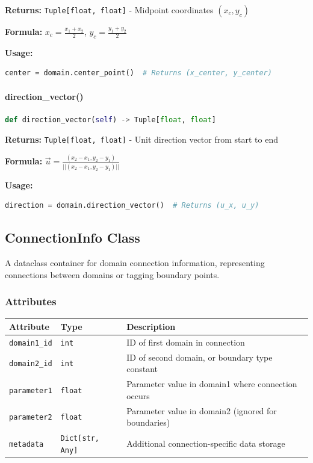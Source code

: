 \textbf{Returns:} \texttt{Tuple[float, float]} - Midpoint coordinates $(x_c, y_c)$

\textbf{Formula:} $x_c = \frac{x_1 + x_2}{2}$, $y_c = \frac{y_1 + y_2}{2}$

\textbf{Usage:}
\begin{lstlisting}[language=Python]
center = domain.center_point()  # Returns (x_center, y_center)
\end{lstlisting}

\paragraph{direction\_vector()}\leavevmode
\begin{lstlisting}[language=Python, caption=Direction Vector Calculation]
def direction_vector(self) -> Tuple[float, float]
\end{lstlisting}

\textbf{Returns:} \texttt{Tuple[float, float]} - Unit direction vector from start to end

\textbf{Formula:} $\vec{u} = \frac{(x_2-x_1, y_2-y_1)}{||(x_2-x_1, y_2-y_1)||}$

\textbf{Usage:}
\begin{lstlisting}[language=Python]
direction = domain.direction_vector()  # Returns (u_x, u_y)
\end{lstlisting}


\subsection{ConnectionInfo Class}
\label{subsec:connectioninfo_class}

A dataclass container for domain connection information, representing connections between domains or tagging boundary points.

\subsubsection{Attributes}

\begin{longtable}{|p{3cm}|p{3.5cm}|p{6cm}|}
	\hline
	\textbf{Attribute} & \textbf{Type} & \textbf{Description} \\
	\hline
	\endhead
	
	\texttt{domain1\_id} & \texttt{int} & ID of first domain in connection \\
	\hline
	
	\texttt{domain2\_id} & \texttt{int} & ID of second domain, or boundary type constant \\
	\hline
	
	\texttt{parameter1} & \texttt{float} & Parameter value in domain1 where connection occurs \\
	\hline
	
	\texttt{parameter2} & \texttt{float} & Parameter value in domain2 (ignored for boundaries) \\
	\hline
	
	\texttt{metadata} & \texttt{Dict[str, Any]} & Additional connection-specific data storage \\
	\hline
	
\end{longtable}

